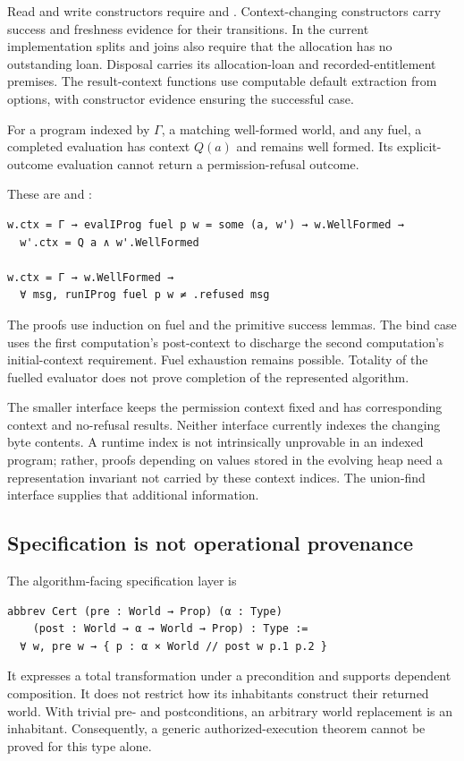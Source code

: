 \documentclass[a4paper,UKenglish,cleveref]{lipics-v2021}
\begin{document}
Read and write constructors require  and
. Context-changing constructors carry success and freshness
evidence for their transitions. In the current implementation splits and joins
also require that the allocation has no outstanding loan. Disposal carries its
allocation-loan and recorded-entitlement premises. The result-context functions
use computable default extraction from options, with constructor evidence
ensuring the successful case.

\begin{theorem}
For a program indexed by $\Gamma$, a matching well-formed world, and any fuel,
a completed evaluation has context $Q(a)$ and remains well formed. Its
explicit-outcome evaluation cannot return a permission-refusal outcome.
\end{theorem}
These are  and :
\begin{lstlisting}
w.ctx = Γ → evalIProg fuel p w = some (a, w') → w.WellFormed →
  w'.ctx = Q a ∧ w'.WellFormed

w.ctx = Γ → w.WellFormed →
  ∀ msg, runIProg fuel p w ≠ .refused msg
\end{lstlisting}
The proofs use induction on fuel and the primitive success lemmas. The bind case
uses the first computation's post-context to discharge the second computation's
initial-context requirement. Fuel exhaustion remains possible. Totality of the
fuelled evaluator does not prove completion of the represented algorithm.

The smaller  interface keeps the permission context fixed and
has corresponding context and no-refusal results. Neither interface currently
indexes the changing byte contents. A runtime index is not intrinsically
unprovable in an indexed program; rather, proofs depending on values stored in
the evolving heap need a representation invariant not carried by these context
indices. The union-find interface supplies that additional information.

\subsection{Specification is not operational provenance}

The algorithm-facing specification layer is
\begin{lstlisting}
abbrev Cert (pre : World → Prop) (α : Type)
    (post : World → α → World → Prop) : Type :=
  ∀ w, pre w → { p : α × World // post w p.1 p.2 }
\end{lstlisting}
It expresses a total transformation under a precondition and supports dependent
composition. It does not restrict how its inhabitants construct their returned
world. With trivial pre- and postconditions, an arbitrary world replacement is
an inhabitant. Consequently, a generic authorized-execution theorem cannot be
proved for this type alone.
\end{document}
